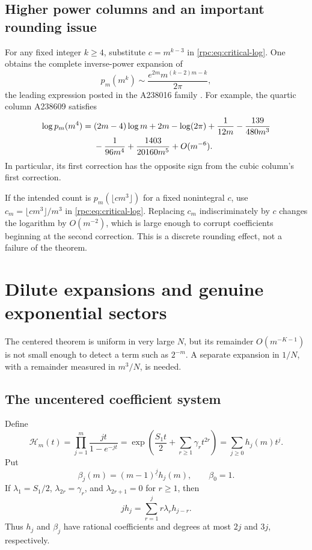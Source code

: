 \documentclass[11pt]{article}
\theoremstyle{definition}
\theoremstyle{remark}
\newcommand{\fall}[2]{#1^{\underline{#2}}}
\numberwithin{equation}{section}
\begin{document}
\subsection{Higher power columns and an important rounding issue}

For any fixed integer $k\ge4$, substitute $c=m^{k-3}$ in
\eqref{rpc:eq:critical-log}. One obtains the complete inverse-power expansion of
\begin{equation}\label{rpc:eq:higherpower}
 p_m(m^k)\sim\frac{e^{2m}m^{(k-2)m-k}}{2\pi},
\end{equation}
the leading expression posted in the A238016 family \cite{oeis238016}.
For example, the quartic column A238609 satisfies
\begin{align}\label{rpc:eq:quartic}
 \log p_m(m^4)={}&(2m-4)\log m+2m-\log(2\pi)
       +\frac1{12m}-\frac{139}{480m^3}\notag\\
       &-\frac1{96m^4}+\frac{1403}{20160m^5}+O(m^{-6}).
\end{align}
In particular, its first correction has the opposite sign from the cubic
column's first correction.

If the intended count is $p_m(\lfloor c m^3\rfloor)$ for a fixed nonintegral
$c$, use $c_m=\lfloor c m^3\rfloor/m^3$ in \eqref{rpc:eq:critical-log}.
Replacing $c_m$ indiscriminately by $c$ changes the logarithm by $O(m^{-2})$,
which is large enough to corrupt coefficients beginning at the second
correction. This is a discrete rounding effect, not a failure of the theorem.

\section{Dilute expansions and genuine exponential sectors}\label{rpc:sec:dilute}

The centered theorem is uniform in very large $N$, but its remainder
$O(m^{-K-1})$ is not small enough to detect a term such as $2^{-m}$.
A separate expansion in $1/N$, with a remainder measured in $m^3/N$, is needed.

\subsection{The uncentered coefficient system}

Define
\begin{equation}\label{rpc:eq:H}
 \mathcal H_m(t)=\prod_{j=1}^m\frac{jt}{1-e^{-jt}}
 =\exp\left(\frac{S_1t}{2}+\sum_{r\ge1}\gamma_rt^{2r}\right)
 =\sum_{j\ge0}h_j(m)t^j.
\end{equation}
Put
\begin{equation}\label{rpc:eq:beta}
 \beta_j(m)=\fall{(m-1)}j h_j(m),\qquad \beta_0=1.
\end{equation}
If $\lambda_1=S_1/2$, $\lambda_{2r}=\gamma_r$, and
$\lambda_{2r+1}=0$ for $r\ge1$, then
\begin{equation}\label{rpc:eq:h-rec}
 jh_j=\sum_{r=1}^j r\lambda_r h_{j-r}.
\end{equation}
Thus $h_j$ and $\beta_j$ have rational coefficients and degrees at most $2j$
and $3j$, respectively.
\end{document}
